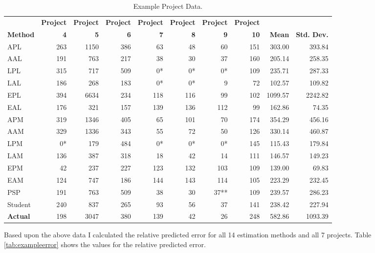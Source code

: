 \begin{table}[htbp]
  \caption{Example Project Data.}  
  \label{tab:exampledata}
  \begin{tabular}{|l|r|r|r|r|r|r|r|r|r|} \hline
    &{\bf Project}&{\bf Project}&{\bf Project}&{\bf Project}&{\bf Project}&{\bf
      Project}&{\bf Project}&& \\ 
    {\bf Method}&{\bf 4}&{\bf 5}&{\bf 6}&{\bf 7}&{\bf 8}&{\bf 9}&{\bf 10}&{\bf
      Mean}&{\bf Std. Dev.} \\ \hline
    APL&263&1150&386&63&48&60&151&303.00&393.84\\ \hline
    AAL&191&763&217&38&30&37&160&205.14&258.35\\ \hline
    LPL&315&717&509&0*&0*&0*&109&235.71&287.33\\ \hline
    LAL&186&268&183&0*&0*&9&72&102.57&109.82\\ \hline
    EPL&394&6634&234&118&116&99&102&1099.57&2242.82\\ \hline
    EAL&176&321&157&139&136&112&99&162.86&74.35\\ \hline
    APM&319&1346&405&65&101&70&174&354.29&456.16\\ \hline
    AAM&329&1336&343&55&72&50&126&330.14&460.87\\ \hline
    LPM&0*&179&484&0*&0*&0*&145&115.43&179.84\\ \hline
    LAM&136&387&318&18&42&14&111&146.57&149.23\\ \hline
    EPM&42&237&227&123&132&103&109&139.00&69.83\\ \hline
    EAM&124&747&186&144&143&114&105&223.29&232.45\\ \hline
    PSP&191&763&509&38&30&37**&109&239.57&286.23\\ \hline
    Student&240&837&265&93&56&37&141&238.42&227.94\\ \hline
    {\bf Actual}&198&3047&380&139&42&26&248&582.86&1093.39\\ \hline
  \end{tabular}
\end{table}


Based upon the above data I calculated the relative predicted error for all 14
estimation methods and all 7 projects.  Table \ref{tab:exampleerror} shows the
values for the relative predicted error.

